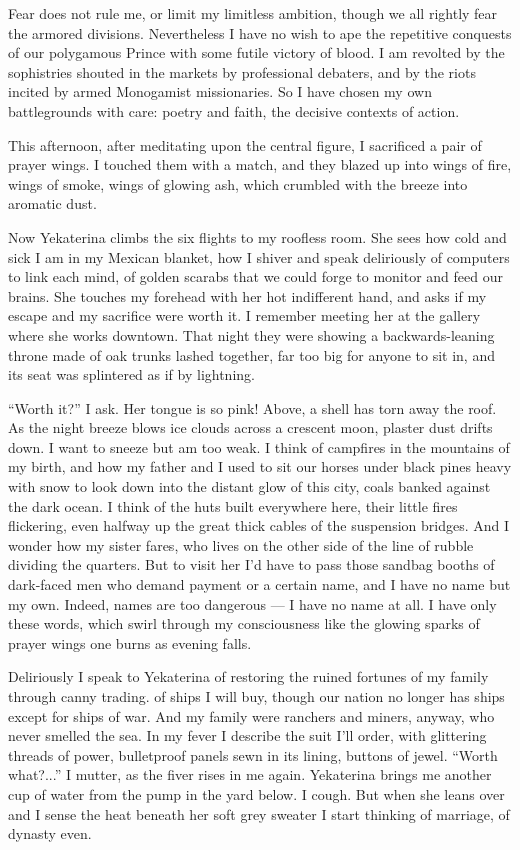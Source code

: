 \documentclass[english,11pt,letterpaper,onecolumn]{scrbook}
\begin{document}
	Fear does not rule me, or limit my limitless ambition, though we all rightly fear the armored divisions.  Nevertheless I have no wish to ape the repetitive conquests of our polygamous Prince with some futile victory of blood.  I am revolted by the sophistries shouted in the markets by professional debaters, and by the riots incited by armed Monogamist missionaries.  So I have chosen my own battlegrounds with care:  poetry and faith, the decisive contexts of action.

	This afternoon, after meditating upon the central figure, I sacrificed a pair of prayer wings.  I touched them with a match, and they blazed up into wings of fire, wings of smoke, wings of glowing ash, which crumbled with the breeze into aromatic dust.

	Now Yekaterina climbs the six flights to my roofless room.  She sees how cold and sick I am in my Mexican blanket, how I shiver and speak deliriously of computers to link each mind, of golden scarabs that we could forge to monitor and feed our brains.  She touches my forehead with her hot indifferent hand, and asks if my escape and my sacrifice were worth it.  I remember meeting her at the gallery where she works downtown.  That night they were showing a backwards-leaning throne made of oak trunks lashed together, far too big for anyone to sit in, and its seat was splintered as if by lightning.

	``Worth it?'' I ask.  Her tongue is so pink!  Above, a shell has torn away the roof.  As the night breeze blows ice clouds across a crescent moon, plaster dust drifts down.  I want to sneeze but am too weak.  I think of campfires in the mountains of my birth, and how my father and I used to sit our horses under black pines heavy with snow to look down into the distant glow of this city, coals banked against the dark ocean.  I think of the huts built everywhere here, their little fires flickering, even halfway up the great thick cables of the suspension bridges.  And I wonder how my sister fares, who lives on the other side of the line of rubble dividing the quarters.  But to visit her I'd have to pass those sandbag booths of dark-faced men who demand payment or a certain name, and I have no name but my own.  Indeed, names are too dangerous --- I have no name at all.  I have only these words, which swirl through my consciousness like the glowing sparks of prayer wings one burns as evening falls.

	Deliriously I speak to Yekaterina of restoring the ruined fortunes of my family through canny trading. of ships I will buy, though our nation no longer has ships except for ships of war.  And my family were ranchers and miners, anyway, who never smelled the sea.  In my fever I describe the suit I'll order, with glittering threads of power, bulletproof panels sewn in its lining, buttons of jewel.  ``Worth what?...'' I mutter, as the fiver rises in me again.  Yekaterina brings me another cup of water from the pump in the yard below.  I cough.  But when she leans over and I sense the heat beneath her soft grey sweater I start thinking of marriage, of dynasty even.
\end{document}
